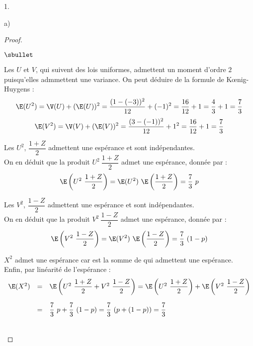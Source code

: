 \begin{noliste}{1.}
\begin{noliste}{a)}
\begin{proof}
\begin{noliste}{$\sbullet$}
      \item Les \var $U$ et $V$, qui suivent des lois uniformes,
        admettent un moment d'ordre $2$ puisqu'elles admmettent une
        variance. On peut déduire de la formule de K\oe{}nig-Huygens :
        \[
        \E(U^2) = \V(U) + (\E(U))^2 = \dfrac{(1-(-3))^2}{12} + (-1)^2
        = \dfrac{16}{12} + 1 = \dfrac{4}{3} + 1 = \dfrac{7}{3}
        \]
        \[
        \E(V^2) = \V(V) + (\E(V))^2 = \dfrac{(3-(-1))^2}{12} + 1^2 =
        \dfrac{16}{12} + 1 = \dfrac{7}{3}
        \]

      \item Les \var $U^2$, $\dfrac{1 + Z}{2}$ admettent une espérance
        et sont indépendantes.\\
        On en déduit que la \var produit $U^2 \ \dfrac{1 + Z}{2}$
        admet une espérance, donnée par :
        \[
        \E\left( U^2 \ \dfrac{1 + Z}{2} \right) = \E(U^2) \
        \E\left(\dfrac{1 + Z}{2}\right) = \dfrac{7}{3} \ p
        \]

      \item Les \var $V^2$, $\dfrac{1 - Z}{2}$ admettent une espérance
        et sont indépendantes. \\
        On en déduit que la \var produit $V^2 \ \dfrac{1 - Z}{2}$
        admet une espérance, donnée par :
        \[
        \E\left( V^2 \ \dfrac{1 - Z}{2} \right) = \E(V^2) \
        \E\left(\dfrac{1 - Z}{2} \right) = \dfrac{7}{3} \ (1-p)
        \]

      \item $X^2$ admet une espérance car est la somme de \var qui
        admettent une espérance.\\
        Enfin, par linéarité de l'espérance :
        \[
        \begin{array}{rcl}
          \E(X^2) & = & \E\left(U^2 \ \dfrac{1 + Z}{2} + V^2 \ \dfrac{1 -
              Z}{2}\right) = \E\left(U^2 \ \dfrac{1 + Z}{2}\right) +
          \E\left(V^2 \ \dfrac{1 - Z}{2}\right) \\[.6cm]
          & = & \dfrac{7}{3} \ p + \dfrac{7}{3} \ (1-p) = \dfrac{7}{3}
          \ (p+(1-p)) = \dfrac{7}{3}
        \end{array}
        \]        
      \end{noliste}
      ~\\[-1.2cm]
    \end{proof}

\end{noliste}


\end{noliste}
